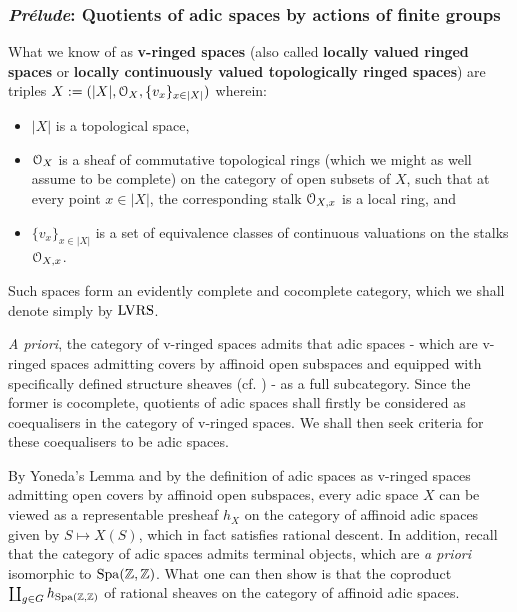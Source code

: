         \subsubsection{\textit{Pr\'elude}: Quotients of adic spaces by actions of finite groups}
            \begin{convention} \label{conv: locally_valued_ringed_spaces}
                What we know of as \textbf{v-ringed spaces} (also called \textbf{locally valued ringed spaces} or \textbf{locally continuously valued topologically ringed spaces}) are triples $X := (|X|, \mathcal{O}_X, \{v_x\}_{x \in |X|})$ wherein:
                    \begin{itemize}
                        \item $|X|$ is a topological space,
                        \item $\mathcal{O}_X$ is a sheaf of commutative topological rings (which we might as well assume to be complete) on the category of open subsets of $X$, such that at every point $x \in |X|$, the corresponding stalk $\mathcal{O}_{X, x}$ is a local ring, and
                        \item $\{v_x\}_{x \in |X|}$ is a set of equivalence classes of continuous valuations on the stalks $\mathcal{O}_{X, x}$.
                    \end{itemize}
                Such spaces form an evidently complete and cocomplete category, which we shall denote simply by $\mathrm{LVRS}$.
            \end{convention}
            \begin{remark}
                \textit{A priori}, the category of v-ringed spaces admits that adic spaces - which are v-ringed spaces admitting covers by affinoid open subspaces and equipped with specifically defined structure sheaves (cf. \cite[Definition 3.1.6]{scholze_weinstein_2020_berkeley_lectures_on_p_adic_geometry}) - as a full subcategory. Since the former is cocomplete, quotients of adic spaces shall firstly be considered as coequalisers in the category of v-ringed spaces. We shall then seek criteria for these coequalisers to be adic spaces. 
            \end{remark}
            \begin{remark}
                By Yoneda's Lemma and by the definition of adic spaces as v-ringed spaces admitting open covers by affinoid open subspaces, every adic space $X$ can be viewed as a representable presheaf $h_X$ on the category of affinoid adic spaces given by $S \mapsto X(S)$, which in fact satisfies rational descent. In addition, recall that the category of adic spaces admits terminal objects, which are \textit{a priori} isomorphic to $\operatorname{Spa}(\mathbb{Z}, \mathbb{Z})$. What one can then show is that the coproduct $\coprod_{g \in G} h_{\operatorname{Spa}(\mathbb{Z}, \mathbb{Z})}$ of rational sheaves on the category of affinoid adic spaces.
            \end{remark}
